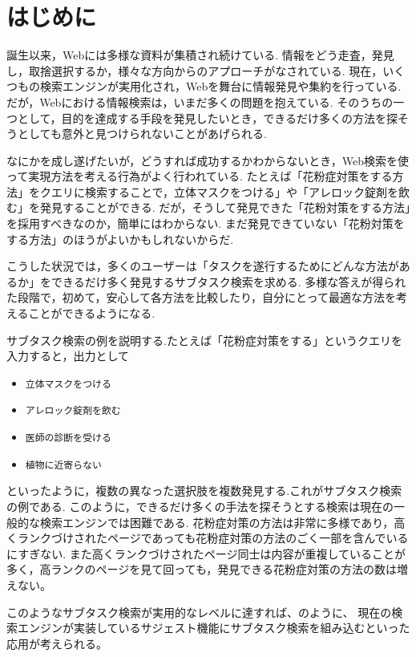 \documentclass[submit,techreq]{ipsj}
\def\|{\verb|}
\begin{document}
%1
\section{はじめに}

誕生以来，Webには多様な資料が集積され続けている. 情報をどう走査，発見し，取捨選択するか，様々な方向からのアプローチがなされている. 
現在，いくつもの検索エンジンが実用化され，Webを舞台に情報発見や集約を行っている. だが，Webにおける情報検索は，いまだ多くの問題を抱えている. 
そのうちの一つとして，目的を達成する手段を発見したいとき，できるだけ多くの方法を探そうとしても意外と見つけられないことがあげられる.


なにかを成し遂げたいが，どうすれば成功するかわからないとき，Web検索を使って実現方法を考える行為がよく行われている. たとえば「花粉症対策をする方法」をクエリに検索することで，立体マスクをつける」や「アレロック錠剤を飲む」を発見することができる. だが，そうして発見できた「花粉対策をする方法」を採用すべきなのか，簡単にはわからない. まだ発見できていない「花粉対策をする方法」のほうがよいかもしれないからだ.


こうした状況では，多くのユーザーは「タスクを遂行するためにどんな方法があるか」をできるだけ多く発見するサブタスク検索を求める. 多様な答えが得られた段階で，初めて，安心して各方法を比較したり，自分にとって最適な方法を考えることができるようになる.

サブタスク検索の例を説明する.たとえば「花粉症対策をする」というクエリを入力すると，出力として


\begin{itemize}
\item \|立体マスクをつける|
\item \|アレロック錠剤を飲む|
\item \|医師の診断を受ける|
\item \|植物に近寄らない|
\end{itemize}


といったように，複数の異なった選択肢を複数発見する.これがサブタスク検索の例である. このように，できるだけ多くの手法を探そうとする検索は現在の一般的な検索エンジンでは困難である. 花粉症対策の方法は非常に多様であり，高くランクづけされたページであっても花粉症対策の方法のごく一部を含んでいるにすぎない. また高くランクづけされたページ同士は内容が重複していることが多く，高ランクのページを見て回っても，発見できる花粉症対策の方法の数は増えない。

このようなサブタスク検索が実用的なレベルに達すれば、のように、 現在の検索エンジンが実装しているサジェスト機能にサブタスク検索を組み込むといった応用が考えられる。
\end{document}
